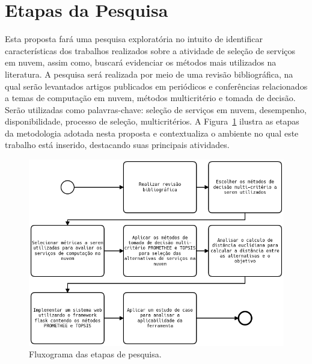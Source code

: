 \documentclass[openany, a4paper,12pt, oneside]{article}
\begin{document}
\section{Etapas da Pesquisa}
\label{sec-pesq}


Esta proposta fará uma pesquisa exploratória no intuito de identificar características dos trabalhos
realizados sobre a atividade de seleção de serviços em nuvem, assim como, buscará evidenciar os métodos
mais utilizados na literatura. A pesquisa será realizada por meio de uma revisão bibliográfica, na qual
serão levantados artigos publicados em periódicos e conferências relacionados a temas de computação em
nuvem, métodos multicritério e tomada de decisão. Serão utilizadas como palavras-chave:
seleção de serviços em nuvem, desempenho, disponibilidade, processo de seleção, multicritérios.
A Figura~\ref{fig:metodologia} ilustra as etapas da metodologia adotada nesta proposta e contextualiza
o ambiente no qual este trabalho está inserido, destacando suas principais atividades.

\begin{figure}[h]
    \centering
    \includegraphics[width=\textwidth]{fluxo}
    \caption{Fluxograma das etapas de pesquisa.}
    \label{fig:metodologia}
\end{figure}
\end{document}
